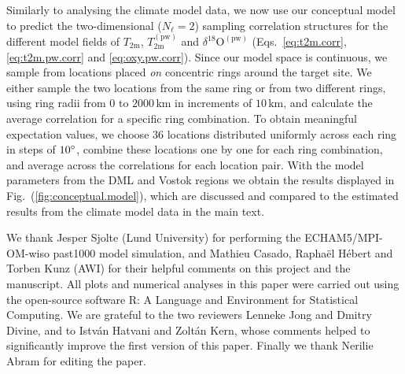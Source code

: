 \documentclass[cp, manuscript]{copernicus}
\begin{document}
Similarly to analysing the climate model data, we now use our conceptual model
to predict the two-dimensional ($N_{\ell}=2$) sampling correlation structures for the
different model fields of $T_{\mathrm{2m}}$, $T_{\mathrm{2m}}^{\mathrm{(pw)}}$
and $\delta^{18}\mathrm{O}^{\mathrm{(pw)}}$ (Eqs.~\ref{eq:t2m.corr},
\ref{eq:t2m.pw.corr} and \ref{eq:oxy.pw.corr}). Since our model space is
continuous, we sample from locations placed \emph{on} concentric rings around
the target site. We either sample the two locations from the same ring or from
two different rings, using ring radii from $0$ to $2000$\,km in increments of
$10$\,km, and calculate the average correlation for a specific ring
combination. To obtain meaningful expectation values, we choose $36$ locations
distributed uniformly across each ring in steps of $10^{\circ}$, combine
these locations one by one for each ring combination, and average across the
correlations for each location pair. With the model parameters from the DML and
Vostok regions we obtain the results displayed in
Fig.~(\ref{fig:conceptual.model}), which are discussed and compared to the
estimated results from the climate model data in the main text.

\noappendix


\begin{acknowledgements}
We thank Jesper Sjolte (Lund University) for performing the ECHAM5/MPI-OM-wiso
past1000 model simulation, and Mathieu Casado, Rapha\"{e}l H\'{e}bert and Torben
Kunz (AWI) for their helpful comments on this project and the manuscript. All
plots and numerical analyses in this paper were carried out using the
open-source software R: A Language and Environment for Statistical Computing. We
are grateful to the two reviewers Lenneke Jong and Dmitry Divine, and to
Istv{\'a}n Hatvani and Zolt{\'a}n Kern, whose comments helped to significantly
improve the first version of this paper. Finally we thank Nerilie Abram for
editing the paper.
\end{acknowledgements}



\end{document}
